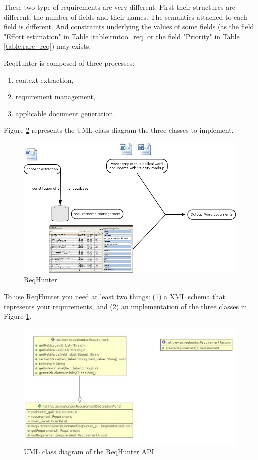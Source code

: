 \documentclass{llncs}
\begin{document}
These two type of requirements are very different. First their structures are different, the number of fields and their names. The semantics attached to each field is different. And constraints underlying the values of some fields (as the field "Effort estimation" in Table \ref{table:rmtoo_req} or the field "Priority" in Table \ref{table:rare_req}) may exists.

ReqHunter is composed of three processes:
\begin{enumerate}
  \item context extraction,
  \item requirement management,
  \item applicable document generation.
\end{enumerate}

Figure \ref{fig:reqhunter_api} represents the UML class diagram the three classes to implement.

\begin{figure}[H]
	\centering
	\includegraphics[width=\linewidth]{Diagram1.png}
	\caption{ReqHunter}
	\label{fig:reqhunter}
\end{figure}

To use ReqHunter you need at least two things: (1) a XML schema that represents your requirements, and (2) an implementation of the three classes in Figure \ref{fig:reqhunter}.

\begin{figure}[H]
	\centering
	\includegraphics[width=\linewidth]{ReqHunter_API-1.jpg}
	\caption{UML class diagram of the ReqHunter API}
	\label{fig:reqhunter_api}
\end{figure}
\end{document}
